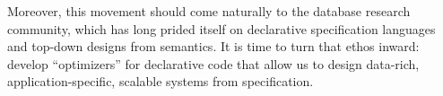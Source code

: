 \documentclass{sig-alternate}
\begin{document}
Moreover, this movement should come naturally to the database research community, which has long prided itself on declarative specification languages and top-down designs from semantics.  It is time to turn that ethos inward: develop ``optimizers'' for declarative code that allow us to design data-rich, application-specific, scalable systems from specification.




\end{document}
